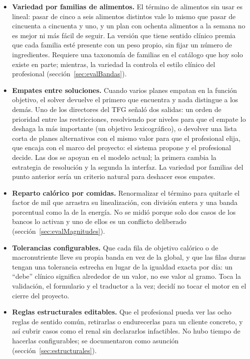 \begin{itemize}
    \item \textbf{Variedad por familias de alimentos.} El término de alimentos sin usar es lineal: pasar de cinco a seis alimentos distintos vale lo mismo que pasar de cincuenta a cincuenta y uno, y un plan con ochenta alimentos a la semana no es mejor ni más fácil de seguir. La versión que tiene sentido clínico premia que cada familia esté presente con un peso propio, sin fijar un número de ingredientes. Requiere una taxonomía de familias en el catálogo que hoy solo existe en parte; mientras, la variedad la controla el estilo clínico del profesional (sección~\ref{sec:evalBandas}).
    \item \textbf{Empates entre soluciones.} Cuando varios planes empatan en la función objetivo, el solver devuelve el primero que encuentra y nada distingue a los demás. Uno de los directores del TFG señaló dos salidas: un orden de prioridad entre las restricciones, resolviendo por niveles para que el empate lo deshaga la más importante (un objetivo lexicográfico), o devolver una lista corta de planes alternativos con el mismo valor para que el profesional elija, que encaja con el marco del proyecto: el sistema propone y el profesional decide. Las dos se apoyan en el modelo actual; la primera cambia la estrategia de resolución y la segunda la interfaz. La variedad por familias del punto anterior sería un criterio natural para deshacer esos empates.
    \item \textbf{Reparto calórico por comidas.} Renormalizar el término para quitarle el factor de mil que arrastra su linealización, con división entera y una banda porcentual como la de la energía. No se midió porque solo dos casos de los bancos lo activan y uno de ellos es un conflicto deliberado (sección~\ref{sec:evalMagnitudes}).
    \item \textbf{Tolerancias configurables.} Que cada fila de objetivo calórico o de macronutriente lleve su propia banda en vez de la global, y que las filas duras tengan una tolerancia estrecha en lugar de la igualdad exacta por día: un ``debe'' clínico significa alrededor de un valor, no ese valor al gramo. Toca la validación, el formulario y el traductor a la vez; decidí no tocar el motor en el cierre del proyecto.
    \item \textbf{Reglas estructurales editables.} Que el profesional pueda ver las ocho reglas de sentido común, retirarlas o endurecerlas para un cliente concreto, y así cubrir casos como el renal sin declararlos infactibles. No hubo tiempo de hacerlas configurables; se documentaron como asunción (sección~\ref{sec:estructurales}).

\end{itemize}
